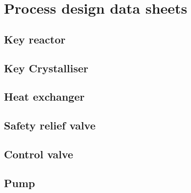 \section{Process design data sheets}

\subsection{Key reactor}

\subsection{Key Crystalliser}

\subsection{Heat exchanger}

\subsection{Safety relief valve}

\subsection{Control valve}

\subsection{Pump}

\subsection{}

\subsection{}

\subsection{}

\subsection{}

\subsection{}

